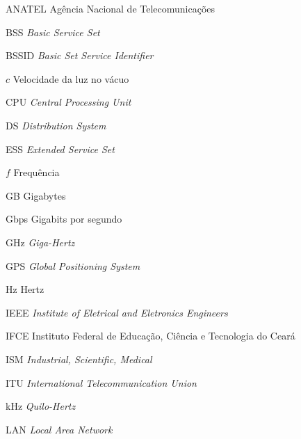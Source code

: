 \begin{siglas} \itemsep -1pt	
	\item[ANATEL] \hspace{.8cm} Agência Nacional de Telecomunicações
	\item[BSS] \hspace{.8cm} \textit{Basic Service Set}
	\item[BSSID] \hspace{.8cm} \textit{Basic Set Service Identifier}
	\item[$c$] \hspace{.8cm} Velocidade da luz no vácuo
	\item[CPU] \hspace{.8cm} \textit{Central Processing Unit}
	\item[DS] \hspace{.8cm} \textit{Distribution System}
	\item[ESS] \hspace{.8cm} \textit{Extended Service Set}
	\item[$f$] \hspace{.8cm} Frequência
	\item[GB] \hspace{.8cm} Gigabytes
	\item[Gbps] \hspace{.8cm} Gigabits por segundo
	\item[GHz] \hspace{.8cm} \textit{Giga-Hertz}
	\item[GPS] \hspace{.8cm} \textit{Global Positioning System}
	\item[Hz] \hspace{.8cm} Hertz
	\item[IEEE] \hspace{.8cm} \textit{Institute of Eletrical and Eletronics Engineers}
	\item[IFCE] \hspace{.8cm} Instituto Federal de Educação, Ciência e Tecnologia do Ceará
	\item[ISM] \hspace{.8cm} \textit{Industrial, Scientific, Medical}
	\item[ITU] \hspace{.8cm} \textit{International Telecommunication Union}
	\item[kHz] \hspace{.8cm} \textit{Quilo-Hertz}
	\item[LAN] \hspace{.8cm} \textit{Local Area Network}

\end{siglas}
